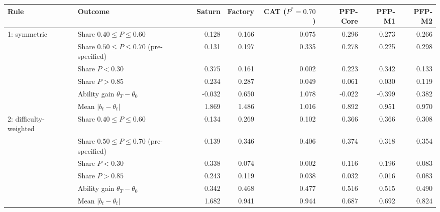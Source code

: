\begin{tabular}{l l r r r r r r}
\toprule
Rule & Outcome & Saturn & Factory & CAT ($P^\ast{=}0.70$) & PFP-Core & PFP-M1 & PFP-M2 \\
\midrule
1: symmetric & Share $0.40 \le P \le 0.60$ & 0.128 & 0.166 & 0.075 & 0.296 & 0.273 & 0.266 \\
 & Share $0.50 \le P \le 0.70$ (pre-specified) & 0.131 & 0.197 & 0.335 & 0.278 & 0.225 & 0.298 \\
 & Share $P < 0.30$ & 0.375 & 0.161 & 0.002 & 0.223 & 0.342 & 0.133 \\
 & Share $P > 0.85$ & 0.234 & 0.287 & 0.049 & 0.061 & 0.030 & 0.119 \\
 & Ability gain $\theta_T-\theta_0$ & -0.032 & 0.650 & 1.078 & -0.022 & -0.399 & 0.382 \\
 & Mean $|b_t-\theta_t|$ & 1.869 & 1.486 & 1.016 & 0.892 & 0.951 & 0.970 \\
\midrule
2: difficulty-weighted & Share $0.40 \le P \le 0.60$ & 0.134 & 0.269 & 0.102 & 0.366 & 0.366 & 0.308 \\
 & Share $0.50 \le P \le 0.70$ (pre-specified) & 0.139 & 0.346 & 0.406 & 0.374 & 0.318 & 0.354 \\
 & Share $P < 0.30$ & 0.338 & 0.074 & 0.002 & 0.116 & 0.196 & 0.083 \\
 & Share $P > 0.85$ & 0.243 & 0.119 & 0.038 & 0.032 & 0.016 & 0.083 \\
 & Ability gain $\theta_T-\theta_0$ & 0.342 & 0.468 & 0.477 & 0.516 & 0.515 & 0.490 \\
 & Mean $|b_t-\theta_t|$ & 1.682 & 0.941 & 0.944 & 0.687 & 0.692 & 0.824 \\
\bottomrule
\end{tabular}
